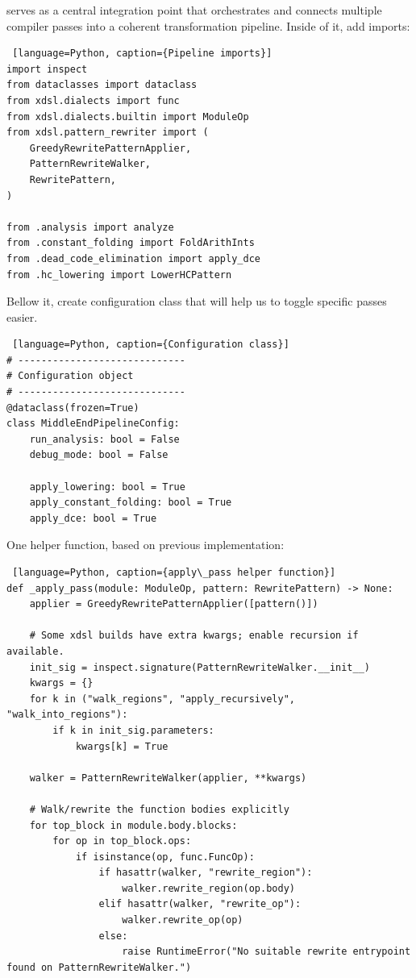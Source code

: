 \documentclass[../main.tex]{subfiles}
\begin{document}
 serves as a central integration point that orchestrates and connects
multiple compiler passes into a coherent transformation pipeline.
Inside of it, add imports:
\begin{lstlisting} [language=Python, caption={Pipeline imports}]
import inspect
from dataclasses import dataclass
from xdsl.dialects import func
from xdsl.dialects.builtin import ModuleOp
from xdsl.pattern_rewriter import (
    GreedyRewritePatternApplier,
    PatternRewriteWalker,
    RewritePattern,
)

from .analysis import analyze
from .constant_folding import FoldArithInts
from .dead_code_elimination import apply_dce
from .hc_lowering import LowerHCPattern
\end{lstlisting}
Bellow it, create configuration class that will help us to toggle specific passes easier.
\begin{lstlisting} [language=Python, caption={Configuration class}]
# -----------------------------
# Configuration object
# -----------------------------
@dataclass(frozen=True)
class MiddleEndPipelineConfig:
    run_analysis: bool = False
    debug_mode: bool = False

    apply_lowering: bool = True
    apply_constant_folding: bool = True
    apply_dce: bool = True
\end{lstlisting}
One helper function, based on previous implementation:
\begin{lstlisting} [language=Python, caption={apply\_pass helper function}]
def _apply_pass(module: ModuleOp, pattern: RewritePattern) -> None:
    applier = GreedyRewritePatternApplier([pattern()])

    # Some xdsl builds have extra kwargs; enable recursion if available.
    init_sig = inspect.signature(PatternRewriteWalker.__init__)
    kwargs = {}
    for k in ("walk_regions", "apply_recursively", "walk_into_regions"):
        if k in init_sig.parameters:
            kwargs[k] = True

    walker = PatternRewriteWalker(applier, **kwargs)

    # Walk/rewrite the function bodies explicitly
    for top_block in module.body.blocks:
        for op in top_block.ops:
            if isinstance(op, func.FuncOp):
                if hasattr(walker, "rewrite_region"):
                    walker.rewrite_region(op.body)
                elif hasattr(walker, "rewrite_op"):
                    walker.rewrite_op(op)
                else:
                    raise RuntimeError("No suitable rewrite entrypoint found on PatternRewriteWalker.")
\end{lstlisting}
\end{document}
